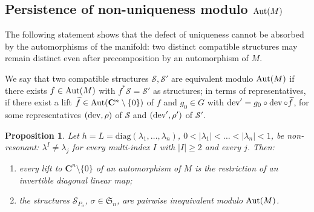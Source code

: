 \documentclass[english,11pt]{amsart}
\newtheorem{proposition}[theorem]{Proposition}
\theoremstyle{definition}
\theoremstyle{remark}
\numberwithin{equation}{section}
\newcommand{\C}{\mathbf{C}}
\newcommand{\Aut}{\mathop{\rm Aut}}
\newcommand{\dev}{\mathop{\rm dev}\nolimits}
\newcommand{\Sc}{\mathcal{S}}
\begin{document}
\subsection{Persistence of non-uniqueness modulo $\Aut(M)$}

The following statement shows that the defect of uniqueness cannot be absorbed by the automorphisms of the manifold: two distinct compatible structures may remain distinct even after precomposition by an automorphism of $M$.

We say that two compatible structures $\Sc,\Sc'$ are equivalent modulo $\Aut(M)$ if there exists $f\in\Aut(M)$ with $f^{*}\Sc=\Sc'$ as structures; in terms of representatives, if there exist a lift $\widetilde f\in\Aut(\C^n\setminus\{0\})$ of $f$ and $g_0\in G$ with $\dev'=g_0\circ\dev\circ\widetilde f$, for some representatives $(\dev,\rho)$ of $\Sc$ and $(\dev',\rho')$ of $\Sc'$.

\begin{proposition}\label{p:autM}
Let $h=L=\mathrm{diag}(\lambda_1,\dots,\lambda_n)$, $0<|\lambda_1|<\dots<|\lambda_n|<1$, be non-resonant: $\lambda^{I}\neq\lambda_j$ for every multi-index $I$ with $|I|\ge2$ and every $j$. Then:
\begin{enumerate}
\item every lift to $\C^n\setminus\{0\}$ of an automorphism of $M$ is the restriction of an invertible diagonal linear map;
\item the structures $\Sc_{P_\sigma}$, $\sigma\in\mathfrak S_n$, are pairwise inequivalent modulo $\Aut(M)$.
\end{enumerate}
\end{proposition}
\end{document}
